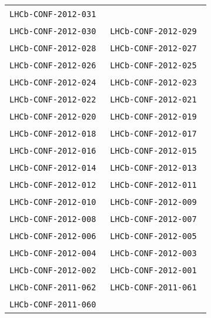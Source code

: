 \begin{center}
\begin{longtable}{ll}
\texttt{LHCb-CONF-2012-031}~\cite{LHCb-CONF-2012-031} \\
\texttt{LHCb-CONF-2012-030}~\cite{LHCb-CONF-2012-030} & 
\texttt{LHCb-CONF-2012-029}~\cite{LHCb-CONF-2012-029} \\
\texttt{LHCb-CONF-2012-028}~\cite{LHCb-CONF-2012-028} & 
\texttt{LHCb-CONF-2012-027}~\cite{LHCb-CONF-2012-027} \\
\texttt{LHCb-CONF-2012-026}~\cite{LHCb-CONF-2012-026} & 
\texttt{LHCb-CONF-2012-025}~\cite{LHCb-CONF-2012-025} \\
\texttt{LHCb-CONF-2012-024}~\cite{LHCb-CONF-2012-024} & 
\texttt{LHCb-CONF-2012-023}~\cite{LHCb-CONF-2012-023} \\
\texttt{LHCb-CONF-2012-022}~\cite{LHCb-CONF-2012-022} & 
\texttt{LHCb-CONF-2012-021}~\cite{LHCb-CONF-2012-021} \\
\texttt{LHCb-CONF-2012-020}~\cite{LHCb-CONF-2012-020} & 
\texttt{LHCb-CONF-2012-019}~\cite{LHCb-CONF-2012-019} \\
\texttt{LHCb-CONF-2012-018}~\cite{LHCb-CONF-2012-018} & 
\texttt{LHCb-CONF-2012-017}~\cite{LHCb-CONF-2012-017} \\
\texttt{LHCb-CONF-2012-016}~\cite{LHCb-CONF-2012-016} & 
\texttt{LHCb-CONF-2012-015}~\cite{LHCb-CONF-2012-015} \\
\texttt{LHCb-CONF-2012-014}~\cite{LHCb-CONF-2012-014} & 
\texttt{LHCb-CONF-2012-013}~\cite{LHCb-CONF-2012-013} \\
\texttt{LHCb-CONF-2012-012}~\cite{LHCb-CONF-2012-012} & 
\texttt{LHCb-CONF-2012-011}~\cite{LHCb-CONF-2012-011} \\
\texttt{LHCb-CONF-2012-010}~\cite{LHCb-CONF-2012-010} & 
\texttt{LHCb-CONF-2012-009}~\cite{LHCb-CONF-2012-009} \\
\texttt{LHCb-CONF-2012-008}~\cite{LHCb-CONF-2012-008} & 
\texttt{LHCb-CONF-2012-007}~\cite{LHCb-CONF-2012-007} \\
\texttt{LHCb-CONF-2012-006}~\cite{LHCb-CONF-2012-006} & 
\texttt{LHCb-CONF-2012-005}~\cite{LHCb-CONF-2012-005} \\
\texttt{LHCb-CONF-2012-004}~\cite{LHCb-CONF-2012-004} & 
\texttt{LHCb-CONF-2012-003}~\cite{LHCb-CONF-2012-003} \\
\texttt{LHCb-CONF-2012-002}~\cite{LHCb-CONF-2012-002} & 
\texttt{LHCb-CONF-2012-001}~\cite{LHCb-CONF-2012-001} \\
\midrule
\texttt{LHCb-CONF-2011-062}~\cite{LHCb-CONF-2011-062} &
\texttt{LHCb-CONF-2011-061}~\cite{LHCb-CONF-2011-061} \\ 
\texttt{LHCb-CONF-2011-060}~\cite{LHCb-CONF-2011-060} &

\end{longtable}
\end{center}
